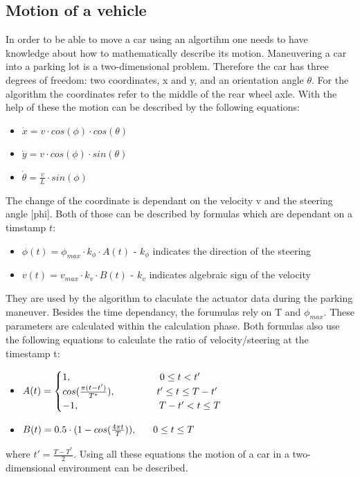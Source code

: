 \documentclass[paper=a4, fontsize=11pt]{scrreprt}
\begin{document}
\subsection{Motion of a vehicle}
In order to be able to move a car using an algortihm one needs to have knowledge about how to mathematically describe its motion. 
Maneuvering a car into a parking lot is a two-dimensional problem. Therefore the car has three degrees of freedom: two coordinates, x and y, and an orientation angle $\theta$. For the algorithm the coordinates refer to the middle of the rear wheel axle. With the help of these the motion can be described by the following equations:
\begin{itemize}
	\item $\dot{x} = v \cdot cos(\phi) \cdot cos(\theta)$
	\item $\dot{y} = v \cdot cos(\phi) \cdot sin(\theta)$
	\item $\dot{\theta} = \frac{v}{L} \cdot sin(\phi)$
\end{itemize}
The change of the coordinate is dependant on the velocity v and the steering angle [phi]. Both of those can be described by formulas which are dependant on a timstamp $t$:
\begin{itemize}
	\item $\phi(t) = \phi_{max} \cdot k_{\phi} \cdot A(t)$ - $k_{\phi}$ indicates the direction of the steering
	\item $v(t) = v_{max} \cdot k_{v} \cdot B(t)$ - $k_{v}$ indicates algebraic sign of the velocity
\end{itemize}
They are used by the algorithm to claculate the actuator data during the parking maneuver. Besides the time dependancy, the forumulas rely on T and $\phi_{max}$. These parameters are calculated within the calculation phase. Both formulas also use the following equations to calculate the ratio of velocity/steering at the timestamp t:
\begin{itemize}
	\item $A(t) = \begin{cases}
					1, \hspace*{3,2cm} 0 \leq t < t'\\
					cos(\frac{\pi(t-t')}{T^*}), \hspace*{1,5cm} t' \leq t \leq T-t'\\
					-1, \hspace*{2,9cm} T-t' < t \leq T\\
				  \end{cases}$
	\item $B(t) = 0.5 \cdot (1 - cos(\frac{4\pi t}{T})), \hspace*{0,6cm} 0 \leq t \leq T$ 
\end{itemize}
where $t' = \frac{T-T^*}{2}$. Using all these equations the motion of a car in a two-dimensional environment can be described.
\end{document}
